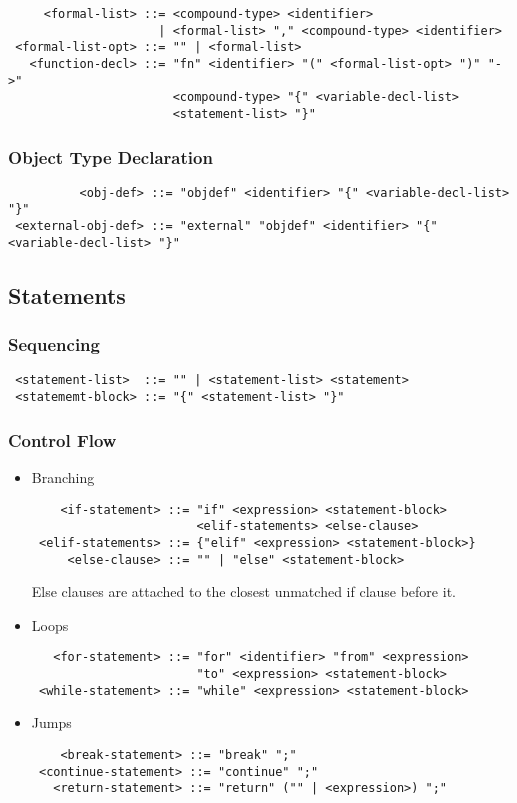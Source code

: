 \begin{verbatim}
     <formal-list> ::= <compound-type> <identifier>
                     | <formal-list> "," <compound-type> <identifier>
 <formal-list-opt> ::= "" | <formal-list>
   <function-decl> ::= "fn" <identifier> "(" <formal-list-opt> ")" "->"
                       <compound-type> "{" <variable-decl-list>
                       <statement-list> "}"
\end{verbatim}

\subsubsection{Object Type Declaration}

\begin{verbatim}
          <obj-def> ::= "objdef" <identifier> "{" <variable-decl-list> "}"
 <external-obj-def> ::= "external" "objdef" <identifier> "{" <variable-decl-list> "}"
\end{verbatim}

\subsection{Statements}

\subsubsection{Sequencing}

\begin{verbatim}
 <statement-list>  ::= "" | <statement-list> <statement>
 <statememt-block> ::= "{" <statement-list> "}"
\end{verbatim}

\subsubsection{Control Flow}

\begin{itemize}
\item Branching
\begin{verbatim}
    <if-statement> ::= "if" <expression> <statement-block>
                       <elif-statements> <else-clause>
 <elif-statements> ::= {"elif" <expression> <statement-block>}
     <else-clause> ::= "" | "else" <statement-block>
\end{verbatim}
Else clauses are attached to the closest unmatched if clause before it.

\item Loops
\begin{verbatim}
   <for-statement> ::= "for" <identifier> "from" <expression>
                       "to" <expression> <statement-block>
 <while-statement> ::= "while" <expression> <statement-block>
\end{verbatim}

\item Jumps
\begin{verbatim}
    <break-statement> ::= "break" ";"
 <continue-statement> ::= "continue" ";"
   <return-statement> ::= "return" ("" | <expression>) ";"
\end{verbatim}
\end{itemize}


